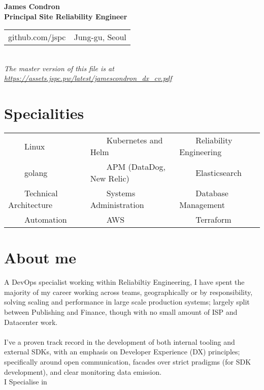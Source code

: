 \documentclass[11pt,a4paper,sans]{article}
\newcommand{\tabitem}{~~\llap{\textbullet}~~}
\begin{document}
\begin{center}
  {\huge\textbf{James Condron}}\\
  \textbf{Principal Site Reliability Engineer} \\

  \begin{tabular}{rl}
    github.com/jspc &  Jung-gu, Seoul
  \end{tabular} \\

  {\footnotesize\textit{The master version of this file is at \url{https://assets.jspc.pw/latest/jamescondron_dx_cv.pdf}}}
\end{center}

\section{Specialities}
\begin{tabular}{lll}
\tabitem Linux & \tabitem Kubernetes and Helm & \tabitem Reliability Engineering \\
\tabitem golang & \tabitem APM (DataDog, New Relic) & \tabitem Elasticsearch \\
\tabitem Technical Architecture & \tabitem Systems Administration & \tabitem Database Management \\
\tabitem Automation & \tabitem AWS & \tabitem Terraform  \\
\end{tabular}

\section{About me}
A DevOps specialist working within Reliabiltiy Engineering, I have spent the majority of my career working across teams, geographically or by responsibility, solving scaling and performance in large scale production systems; largely split between Publishing and Finance, though with no small amount of ISP and Datacenter work. \\
\\
I've a proven track record in the development of both internal tooling and external SDKs, with an emphasis on Developer Experience (DX) principles; specifically around open communication, facades over strict pradigms (for SDK development), and clear monitoring data emission.
\\
I Specialise in
\end{document}
